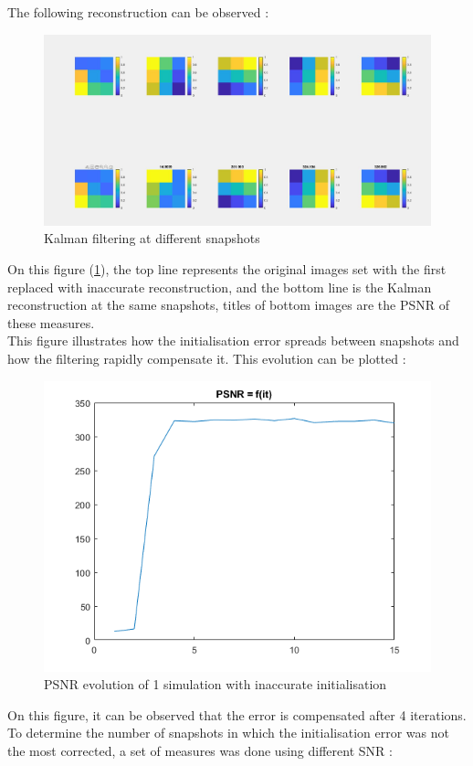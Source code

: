 \documentclass[titlepage,11pt]{article}
\begin{document}
	The following reconstruction can be observed :
	
	\begin{figure}[H]
		\centering
		\includegraphics[width=.8\linewidth]{src/K_ev}
		\caption{Kalman filtering at different snapshots}
		\label{fig:K_ev}
	\end{figure}

	On this figure (\ref{fig:K_ev}), the top line represents the original images set with the first replaced with inaccurate reconstruction, and the bottom line is the Kalman reconstruction at the same snapshots, titles of bottom images are the PSNR of these measures. \\
	
	This figure illustrates how the initialisation error spreads between snapshots and how the filtering rapidly compensate it. This evolution can be plotted :
	
	\begin{figure}[H]
		\centering
		\includegraphics[width=.5\linewidth]{src/evPSNR}
		\caption{PSNR evolution of 1 simulation with inaccurate initialisation}
	\end{figure}

	On this figure, it can be observed that the error is compensated after 4 iterations. \\
	
	To determine the number of snapshots in which the initialisation error was not the most corrected, a set of measures was done using different SNR :
	
\end{document}
